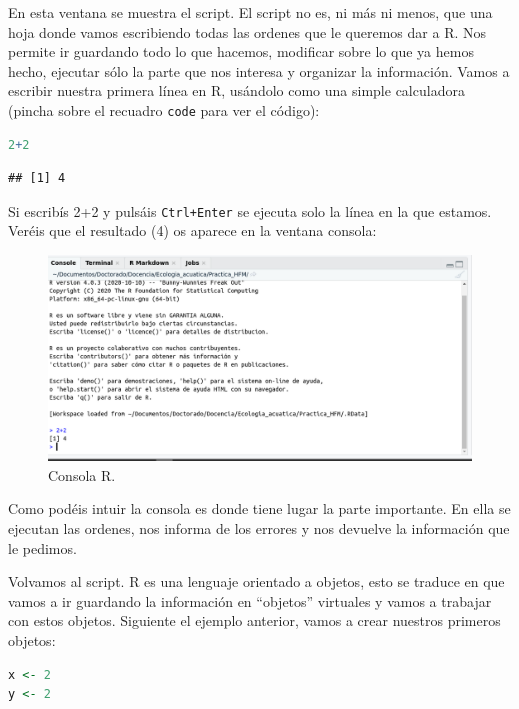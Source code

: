 \documentclass[
]{book}
\newcommand{\passthrough}[1]{#1}
\begin{document}
En esta ventana se muestra el script. El script no es, ni más ni menos, que una hoja donde vamos escribiendo todas las ordenes que le queremos dar a R. Nos permite ir guardando todo lo que hacemos, modificar sobre lo que ya hemos hecho, ejecutar sólo la parte que nos interesa y organizar la información. Vamos a escribir nuestra primera línea en R, usándolo como una simple calculadora (pincha sobre el recuadro \passthrough{\lstinline!code!} para ver el código):

\begin{lstlisting}[language=R]
2+2
\end{lstlisting}

\begin{lstlisting}
## [1] 4
\end{lstlisting}

Si escribís 2+2 y pulsáis \passthrough{\lstinline!Ctrl+Enter!} se ejecuta solo la línea en la que estamos. Veréis que el resultado (4) os aparece en la ventana consola:

\begin{figure}

{\centering \includegraphics[width=1\linewidth]{Img/Console_R_2} 

}

\caption{Consola R.}\label{fig:unnamed-chunk-12}
\end{figure}

Como podéis intuir la consola es donde tiene lugar la parte importante. En ella se ejecutan las ordenes, nos informa de los errores y nos devuelve la información que le pedimos.

Volvamos al script. R es una lenguaje orientado a objetos, esto se traduce en que vamos a ir guardando la información en ``objetos'' virtuales y vamos a trabajar con estos objetos. Siguiente el ejemplo anterior, vamos a crear nuestros primeros objetos:

\begin{lstlisting}[language=R]
x <- 2
y <- 2
\end{lstlisting}
\end{document}
